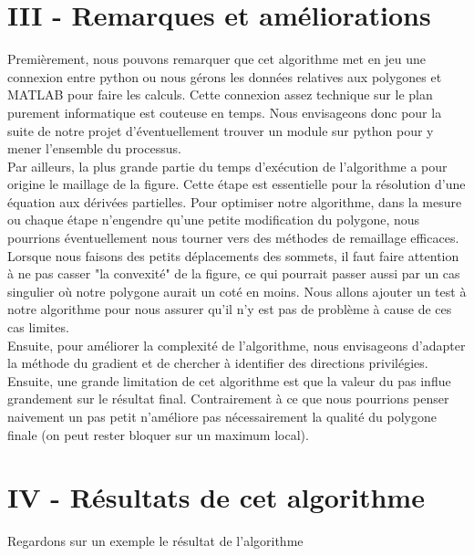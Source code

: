 \documentclass[a4paper,reqno]{article}
\begin{document}
\section*{III - Remarques et améliorations}
Premièrement, nous pouvons remarquer que cet algorithme met en jeu une connexion entre python ou nous gérons les données relatives aux polygones et MATLAB pour faire les calculs. Cette connexion assez technique sur le plan purement informatique est couteuse en temps. Nous envisageons donc pour la suite de notre projet d'éventuellement trouver un module sur python pour y mener l'ensemble du processus. \\
 Par ailleurs, la plus grande partie du temps d'exécution de l'algorithme a pour origine le maillage de la figure. Cette étape est essentielle pour la résolution d'une équation aux dérivées partielles. Pour optimiser notre algorithme, dans la mesure ou chaque étape n'engendre qu'une petite modification du polygone, nous pourrions éventuellement nous tourner vers des méthodes de remaillage efficaces. \\
Lorsque nous faisons des petits déplacements des sommets, il faut faire attention à ne pas casser "la convexité" de la figure, ce qui pourrait passer aussi par un cas singulier où notre polygone aurait un coté en moins. Nous allons ajouter un test à notre algorithme pour nous assurer qu'il n'y est pas de problème à cause de ces cas limites. \\
Ensuite, pour améliorer la complexité de l'algorithme, nous envisageons d'adapter la méthode du gradient et de chercher à identifier des directions privilégies.\\
Ensuite, une grande limitation de cet algorithme est que la valeur du pas influe grandement sur le résultat final. Contrairement à ce que nous pourrions penser naivement un pas petit n'améliore pas nécessairement la qualité du polygone finale (on peut rester bloquer sur un maximum local).

\newpage
\section*{IV - Résultats de cet algorithme }
Regardons sur un exemple le résultat de l'algorithme
\end{document}

